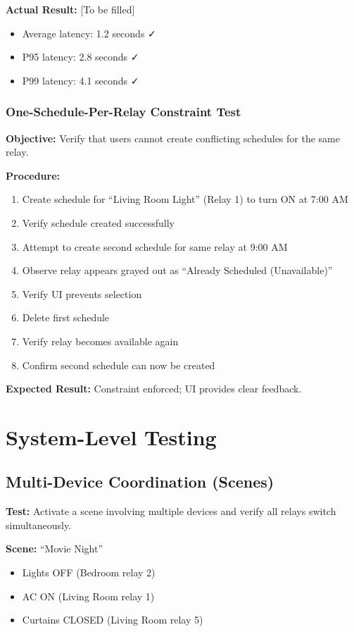 \textbf{Actual Result:} [To be filled]
\begin{itemize}
    \item Average latency: 1.2 seconds ✓
    \item P95 latency: 2.8 seconds ✓
    \item P99 latency: 4.1 seconds ✓
\end{itemize}

\subsubsection{One-Schedule-Per-Relay Constraint Test}

\textbf{Objective:} Verify that users cannot create conflicting schedules for the same relay.

\textbf{Procedure:}
\begin{enumerate}
    \item Create schedule for ``Living Room Light'' (Relay 1) to turn ON at 7:00 AM
    \item Verify schedule created successfully
    \item Attempt to create second schedule for same relay at 9:00 AM
    \item Observe relay appears grayed out as ``Already Scheduled (Unavailable)''
    \item Verify UI prevents selection
    \item Delete first schedule
    \item Verify relay becomes available again
    \item Confirm second schedule can now be created
\end{enumerate}

\textbf{Expected Result:} Constraint enforced; UI provides clear feedback.

\section{System-Level Testing}

\subsection{Multi-Device Coordination (Scenes)}

\textbf{Test:} Activate a scene involving multiple devices and verify all relays switch simultaneously.

\textbf{Scene:} ``Movie Night''
\begin{itemize}
    \item Lights OFF (Bedroom relay 2)
    \item AC ON (Living Room relay 1)
    \item Curtains CLOSED (Living Room relay 5)
\end{itemize}

